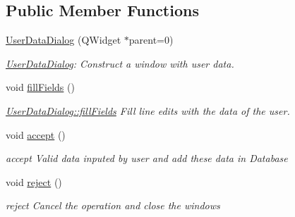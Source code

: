 \subsection*{Public Member Functions}
\begin{DoxyCompactItemize}
\item 
\hyperlink{classGui_1_1Dialogs_1_1UserDataDialog_a3cafa419d49d124e72511a3b91f8ee76}{User\-Data\-Dialog} (Q\-Widget $\ast$parent=0)
\begin{DoxyCompactList}\small\item\em \hyperlink{classGui_1_1Dialogs_1_1UserDataDialog}{User\-Data\-Dialog}\-: Construct a window with user data. \end{DoxyCompactList}\item 
\hypertarget{classGui_1_1Dialogs_1_1UserDataDialog_ae1a17e6547a30b03ba2c837ba0b28455}{void \hyperlink{classGui_1_1Dialogs_1_1UserDataDialog_ae1a17e6547a30b03ba2c837ba0b28455}{fill\-Fields} ()}\label{classGui_1_1Dialogs_1_1UserDataDialog_ae1a17e6547a30b03ba2c837ba0b28455}

\begin{DoxyCompactList}\small\item\em \hyperlink{classGui_1_1Dialogs_1_1UserDataDialog_ae1a17e6547a30b03ba2c837ba0b28455}{User\-Data\-Dialog\-::fill\-Fields} Fill line edits with the data of the user. \end{DoxyCompactList}\item 
\hypertarget{classGui_1_1Dialogs_1_1UserDataDialog_a2d3841c471d0ddfd58610d3667d8521a}{void \hyperlink{classGui_1_1Dialogs_1_1UserDataDialog_a2d3841c471d0ddfd58610d3667d8521a}{accept} ()}\label{classGui_1_1Dialogs_1_1UserDataDialog_a2d3841c471d0ddfd58610d3667d8521a}

\begin{DoxyCompactList}\small\item\em accept Valid data inputed by user and add these data in Database \end{DoxyCompactList}\item 
\hypertarget{classGui_1_1Dialogs_1_1UserDataDialog_a919f59546670019bb4e72fcd0c7ea841}{void \hyperlink{classGui_1_1Dialogs_1_1UserDataDialog_a919f59546670019bb4e72fcd0c7ea841}{reject} ()}\label{classGui_1_1Dialogs_1_1UserDataDialog_a919f59546670019bb4e72fcd0c7ea841}

\begin{DoxyCompactList}\small\item\em reject Cancel the operation and close the windows \end{DoxyCompactList}\end{DoxyCompactItemize}


